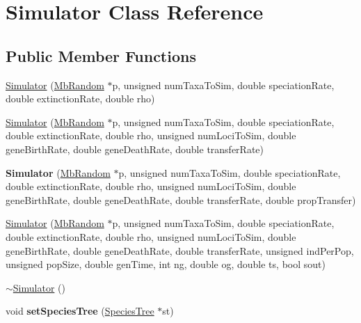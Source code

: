 \hypertarget{class_simulator}{}\section{Simulator Class Reference}
\label{class_simulator}
\subsection*{Public Member Functions}
\begin{DoxyCompactItemize}
\item 
\mbox{\hyperlink{class_simulator_ad76f54c9f7089e19fa2e79749064a233}{Simulator}} (\mbox{\hyperlink{class_mb_random}{Mb\+Random}} $\ast$p, unsigned num\+Taxa\+To\+Sim, double speciation\+Rate, double extinction\+Rate, double rho)
\item 
\mbox{\hyperlink{class_simulator_abdd673afec81537e76e9fd9aecb5b07e}{Simulator}} (\mbox{\hyperlink{class_mb_random}{Mb\+Random}} $\ast$p, unsigned num\+Taxa\+To\+Sim, double speciation\+Rate, double extinction\+Rate, double rho, unsigned num\+Loci\+To\+Sim, double gene\+Birth\+Rate, double gene\+Death\+Rate, double transfer\+Rate)
\item 
\mbox{\label{class_simulator_a79e5c8af2a23cf4853432e4b329a1ed4}} 
{\bfseries Simulator} (\mbox{\hyperlink{class_mb_random}{Mb\+Random}} $\ast$p, unsigned num\+Taxa\+To\+Sim, double speciation\+Rate, double extinction\+Rate, double rho, unsigned num\+Loci\+To\+Sim, double gene\+Birth\+Rate, double gene\+Death\+Rate, double transfer\+Rate, double prop\+Transfer)
\item 
\mbox{\hyperlink{class_simulator_a3583cdc1848ee5b9d92567bd6f15469a}{Simulator}} (\mbox{\hyperlink{class_mb_random}{Mb\+Random}} $\ast$p, unsigned num\+Taxa\+To\+Sim, double speciation\+Rate, double extinction\+Rate, double rho, unsigned num\+Loci\+To\+Sim, double gene\+Birth\+Rate, double gene\+Death\+Rate, double transfer\+Rate, unsigned ind\+Per\+Pop, unsigned pop\+Size, double gen\+Time, int ng, double og, double ts, bool sout)
\item 
\mbox{\hyperlink{class_simulator_a0f49aa04f42060a785adf77346b9de9f}{$\sim$\+Simulator}} ()
\item 
\mbox{\label{class_simulator_abd3de29725cf974dc9cbe46978aa6614}} 
void {\bfseries set\+Species\+Tree} (\mbox{\hyperlink{class_species_tree}{Species\+Tree}} $\ast$st)
\item 

\end{DoxyCompactItemize}
